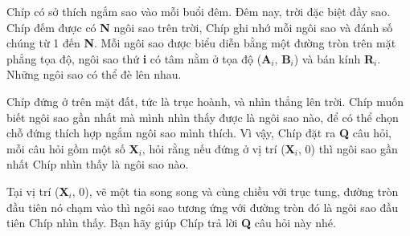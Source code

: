 Chíp có sở thích ngắm sao vào mỗi buổi đêm. Đêm nay, trời đặc biệt đầy sao. Chíp đếm được có \textbf{N} ngôi sao trên trời, Chíp ghi nhớ mỗi ngôi sao và đánh số chúng từ 1 đến \textbf{N}. Mỗi ngôi sao được biểu diễn bằng một đường tròn trên mặt phẳng tọa độ, ngôi sao thứ \textbf{i} có tâm nằm ở tọa độ (\textbf{A$_i$}, \textbf{B$_i$}) và bán kính \textbf{R$_i$}. Những ngôi sao có thể đè lên nhau.

Chíp đứng ở trên mặt đất, tức là trục hoành, và nhìn thẳng lên trời. Chíp muốn biết ngôi sao gần nhất mà mình nhìn thấy được là ngôi sao nào, để có thể chọn chỗ đứng thích hợp ngắm ngôi sao mình thích. Vì vậy, Chíp đặt ra \textbf{Q} câu hỏi, mỗi câu hỏi gồm một số \textbf{X$_i$}, hỏi rằng nếu đứng ở vị trí (\textbf{X$_i$}, 0) thì ngôi sao gần nhất Chíp nhìn thấy là ngôi sao nào.

Tại vị trí (\textbf{X$_i$}, 0), vẽ một tia song song và cùng chiều với trục tung, đường tròn đầu tiên nó chạm vào thì ngôi sao tương ứng với đường tròn đó là ngôi sao đầu tiên Chíp nhìn thấy. Bạn hãy giúp Chíp trả lời \textbf{Q} câu hỏi này nhé.
